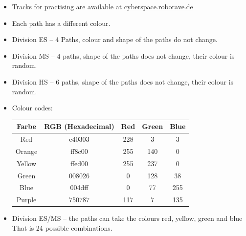 \documentclass[a4paper,12pt]{article}
\begin{document}
\begin{itemize}
	\item Tracks for practising are available at
\href{https://cyberspace.roborave.de}{cyberspace.roborave.de}
	\item Each path has a different colour.
	\item Division ES – 4 Paths, colour and shape of the paths do not
		change.
	\item Division MS – 4 paths, shape of the paths does not change, their
		colour is random.
	\item Division HS – 6 paths, shape of the paths does not change, their
		colour is random.
	\item Colour codes:
\begin{center}
	\begin{tabular}{|c|c|c|c|c|} \hline
		Farbe & RGB (Hexadecimal) & Red & Green & Blue \\ \hline
    		Red & e40303 & 228 & 3 & 3 \\
    		Orange & ff8c00 & 255 & 140 & 0 \\
    		Yellow & ffed00 & 255 & 237 & 0 \\
    		Green & 008026 & 0 & 128 & 38 \\
    		Blue & 004dff & 0 & 77 & 255 \\
    		Purple & 750787 & 117 & 7 & 135 \\ \hline
	\end{tabular}
\end{center}
	\item Division ES/MS – the paths can take the colours red, yellow,
		green and blue That is 24 possible combinations.


\end{itemize}
\end{document}
